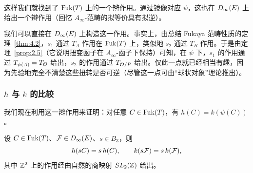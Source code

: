 
这样我们就找到了 $\operatorname{Fuk}(T)$ 上的一个辫作用。通过镜像对应 $\psi$，这也在 $D_\infty(E)$ 上给出一个辫作用（回忆 $A_\infty$-范畴的拟等价具有拟逆）。

我们可以直接在 $D_\infty(E)$ 上构造这一作用。事实上，由总结 Fukaya 范畴性质的定理~\ref{thm:4.2}，$s_1$ 通过 $T_A$ 作用在 $\operatorname{Fuk}(T)$ 上，类似地 $s_2$ 通过 $T_B$ 作用。于是由定理~\ref{prop:2.5}（它说明扭变函子在 $A_\infty$-函子下保持）可知，在 $\psi$ 下，$s_1$ 的作用通过 $T_{\psi(A)}=T_{\mathcal{O}}$ 给出，$s_2$ 的作用通过 $T_{\mathcal{O}/P}$ 给出。仅此一点就已经相当有趣，因为先验地完全不清楚这些扭转是否可逆（尽管这一点可由“球状对象”理论推出）。

\subsubsection*{$h$ 与 $k$ 的比较}

我们现在利用这一辫作用来证明：对任意 $C\in\operatorname{Fuk}(T)$，有 $h(C)=k(\psi(C))$。


\begin{lemma*}
设 $C\in\operatorname{Fuk}(T)$、$\mathcal{F}\in D_\infty(E)$、$s\in B_3$，则
\[
h(sC)=s\,h(C),
\qquad
k(s\mathcal{F})=s\,k(\mathcal{F}),
\]
其中 $\mathbb{Z}^2$ 上的作用经由自然的商映射 $SL_2(\mathbb{Z})$ 给出。
\end{lemma*}

